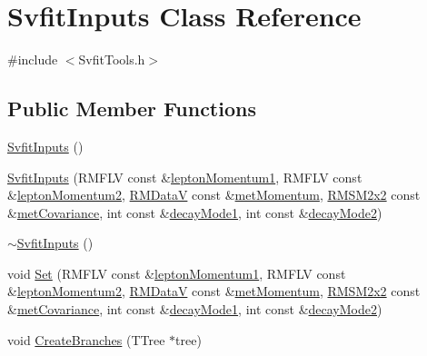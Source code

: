 \hypertarget{classSvfitInputs}{
\section{SvfitInputs Class Reference}
\label{classSvfitInputs}
}


{\ttfamily \#include $<$SvfitTools.h$>$}\subsection*{Public Member Functions}
\begin{DoxyCompactItemize}
\item 
\hyperlink{classSvfitInputs_a358e4bb19752369a54877771ce45f792}{SvfitInputs} ()
\item 
\hyperlink{classSvfitInputs_a64fef6674fbff8c5151d456d2181d55f}{SvfitInputs} (RMFLV const \&\hyperlink{classSvfitInputs_a8cbce6801e4e0ed5a0a376ab13e04697}{leptonMomentum1}, RMFLV const \&\hyperlink{classSvfitInputs_a16b08513227e966888b217e115b1f3e9}{leptonMomentum2}, \hyperlink{SvfitTools_8h_aaf454bd335994d52523052c77c343e3d}{RMDataV} const \&\hyperlink{classSvfitInputs_ace5d904fc75fdff3f820bfc9d67fb87c}{metMomentum}, \hyperlink{SvfitTools_8h_a80fdad30ecf55d29d315471eb3595acd}{RMSM2x2} const \&\hyperlink{classSvfitInputs_ae09cccb51b5186fd72eb03eae338f131}{metCovariance}, int const \&\hyperlink{classSvfitInputs_a784625a886909f4f9743c72f9780ccc5}{decayMode1}, int const \&\hyperlink{classSvfitInputs_a667f1b15f6955a9a40929e9f670eabea}{decayMode2})
\item 
\hyperlink{classSvfitInputs_aa972c71e023c7d68e2ad587bea6ba05b}{$\sim$SvfitInputs} ()
\item 
void \hyperlink{classSvfitInputs_a15284d867ccae598944568329364bcee}{Set} (RMFLV const \&\hyperlink{classSvfitInputs_a8cbce6801e4e0ed5a0a376ab13e04697}{leptonMomentum1}, RMFLV const \&\hyperlink{classSvfitInputs_a16b08513227e966888b217e115b1f3e9}{leptonMomentum2}, \hyperlink{SvfitTools_8h_aaf454bd335994d52523052c77c343e3d}{RMDataV} const \&\hyperlink{classSvfitInputs_ace5d904fc75fdff3f820bfc9d67fb87c}{metMomentum}, \hyperlink{SvfitTools_8h_a80fdad30ecf55d29d315471eb3595acd}{RMSM2x2} const \&\hyperlink{classSvfitInputs_ae09cccb51b5186fd72eb03eae338f131}{metCovariance}, int const \&\hyperlink{classSvfitInputs_a784625a886909f4f9743c72f9780ccc5}{decayMode1}, int const \&\hyperlink{classSvfitInputs_a667f1b15f6955a9a40929e9f670eabea}{decayMode2})
\item 
void \hyperlink{classSvfitInputs_a0620e8f725be08d3097a5cebb90adf0b}{CreateBranches} (TTree $\ast$tree)

\end{DoxyCompactItemize}
